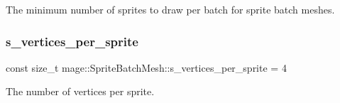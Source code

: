 The minimum number of sprites to draw per batch for sprite batch meshes. \hypertarget{classmage_1_1_sprite_batch_mesh_a089a9cf9b57f43274bb2542b3c30dd55}{}\label{classmage_1_1_sprite_batch_mesh_a089a9cf9b57f43274bb2542b3c30dd55} 
\subsubsection{\texorpdfstring{s\+\_\+vertices\+\_\+per\+\_\+sprite}{s\_vertices\_per\_sprite}}
{\footnotesize\ttfamily const size\+\_\+t mage\+::\+Sprite\+Batch\+Mesh\+::s\+\_\+vertices\+\_\+per\+\_\+sprite = 4\hspace{0.3cm}{\ttfamily [static]}}

The number of vertices per sprite. 